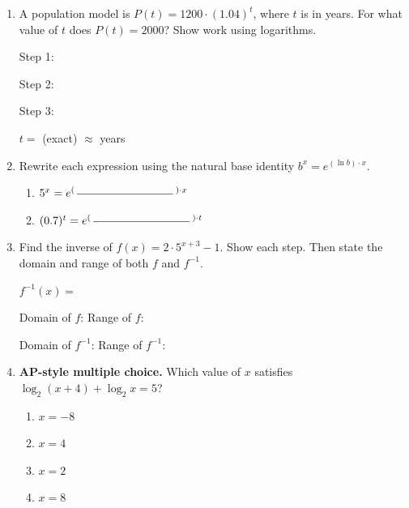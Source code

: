 \documentclass[10pt]{article}
\begin{document}
\begin{enumerate}[leftmargin=1.8em, itemsep=14pt]
\begin{enumerate}[leftmargin=1.5em, itemsep=10pt, label=\alph*.]
  \vspace{4pt}
  Check for extraneous solutions: \writeline

  \vspace{4pt}
  Final answer: $x = $ \blank{2.5cm}
\end{enumerate}

\item A population model is $P(t) = 1200 \cdot (1.04)^t$, where $t$ is in years.
      For what value of $t$ does $P(t) = 2000$? Show work using logarithms.

\vspace{4pt}
Step 1: \writeline

\vspace{4pt}
Step 2: \writeline

\vspace{4pt}
Step 3: \writeline

\vspace{4pt}
$t = $ \blank{5cm} (exact) $\approx $ \blank{2.5cm} years

\item Rewrite each expression using the natural base identity $b^x = e^{(\ln b)\cdot x}$.

\begin{enumerate}[leftmargin=1.5em, itemsep=6pt, label=\alph*.]
  \item $5^x = e^{(\;\blank{3cm}\;)\cdot x}$

  \item $(0.7)^t = e^{(\;\blank{3cm}\;)\cdot t}$
\end{enumerate}

\item Find the inverse of $f(x) = 2 \cdot 5^{x+3} - 1$. Show each step. Then state the
      domain and range of both $f$ and $f^{-1}$.

\vspace{6pt}

\vspace{4pt}
$f^{-1}(x) = $ \blank{6cm}

\vspace{6pt}
Domain of $f$: \blank{3.5cm} \qquad Range of $f$: \blank{3.5cm}

\vspace{4pt}
Domain of $f^{-1}$: \blank{3.5cm} \qquad Range of $f^{-1}$: \blank{3.5cm}

\item \textbf{AP-style multiple choice.} Which value of $x$ satisfies
      $\log_2(x+4) + \log_2 x = 5$?

\vspace{6pt}
\begin{enumerate}[leftmargin=2em, itemsep=4pt, label=(\Alph*)]
  \item $x = -8$
  \item $x = 4$
  \item $x = 2$
  \item $x = 8$
\end{enumerate}

\end{enumerate}
\end{document}
